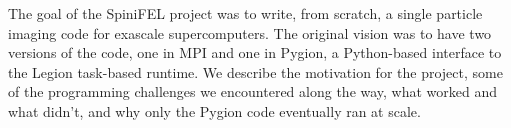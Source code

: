 The goal of the SpiniFEL project was to write, from scratch, a single particle imaging code for exascale supercomputers. The original vision was to have two versions of the code, one in MPI and one in Pygion, a Python-based interface to the Legion task-based runtime. We describe the motivation for the project, some of the programming challenges we encountered along the way, what worked and what didn't, and why only the Pygion code eventually ran at scale.
